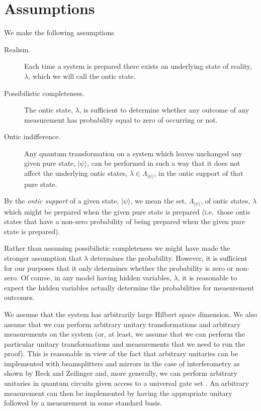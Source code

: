 \documentclass[12pt]{article}
\begin{document}
\section{Assumptions} \label{assumptions}

We make the following assumptions \begin{description} \item[Realism.] Each time a system is prepared there exists an underlying state of reality, $\lambda$, which we will call the ontic
state. \item[Possibilistic completeness.]  The ontic state, $\lambda$, is sufficient to determine whether any outcome of any measurement has probability equal to zero of occurring or not.
\item[Ontic indifference.] Any quantum transformation on a system which leaves unchanged any given pure state, $|\psi\rangle$, can be performed in such a way that it does not affect the
    underlying ontic states, $\lambda\in\Lambda_{|\psi\rangle}$, in the ontic support of that pure state.
\end{description} By the \emph{ontic support} of a given state, $|\psi\rangle$, we mean the set, $\Lambda_{|\psi\rangle}$, of ontic states, $\lambda$ which might be prepared when the given
pure state is prepared (i.e.\ those ontic states that have a non-zero probability of being prepared when the given pure state is prepared).

Rather than assuming possibilistic completeness we might have made the stronger assumption that $\lambda$ determines the probability.  However, it is sufficient for our purposes that it only
determines whether the probability is zero or non-zero.  Of course, in any model having hidden variables, $\lambda$, it is reasonable to expect the hidden variables actually determine the probabilities for measurement outcomes.

We assume that the system has arbitrarily large Hilbert space dimension.  We also assume that we can perform arbitrary unitary transformations and arbitrary measurements on the system (or,
at least, we assume that we can perform the particular unitary transformations and measurements that we need to run the proof).  This is reasonable in view of the fact that arbitrary
unitaries can be implemented with beamsplitters and mirrors in the case of interferometry as shown by Reck and Zeilinger \cite{reck1994experimental} and, more generally, we can perform
arbitrary unitaries in quantum circuits given access to a universal gate set \cite{deutsch1985quantum}.  An arbitrary measurement can then be implemented by having the appropriate unitary
followed by a measurement in some standard basis.
\end{document}
